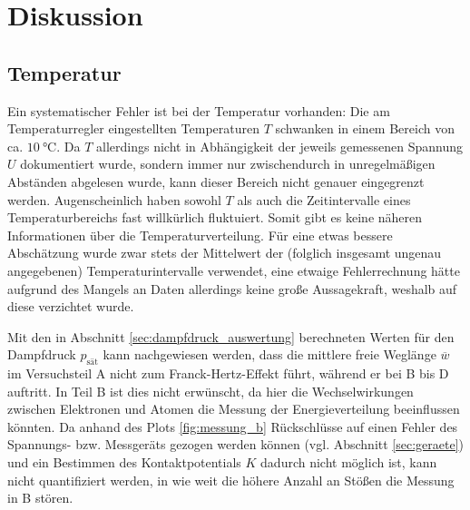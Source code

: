 \section{Diskussion}
\subsection{Temperatur}
\label{sec:temperatur}
Ein systematischer Fehler ist bei der Temperatur vorhanden:
Die am Temperaturregler eingestellten Temperaturen $T$ schwanken in einem Bereich von ca. $\qty[]{10}{\celsius}$.
Da $T$ allerdings nicht in Abhängigkeit der jeweils gemessenen Spannung $U$ dokumentiert wurde, 
sondern immer nur zwischendurch in unregelmäßigen Abständen abgelesen wurde, kann dieser Bereich nicht genauer eingegrenzt werden.
Augenscheinlich haben sowohl $T$ als auch die Zeitintervalle eines Temperaturbereichs fast willkürlich fluktuiert.
Somit gibt es keine näheren Informationen über die Temperaturverteilung.
Für eine etwas bessere Abschätzung wurde zwar stets der Mittelwert der (folglich insgesamt ungenau angegebenen) Temperaturintervalle verwendet,
eine etwaige Fehlerrechnung hätte aufgrund des Mangels an Daten allerdings keine große Aussagekraft, weshalb auf diese verzichtet wurde.

\noindent
Mit den in Abschnitt \ref{sec:dampfdruck_auswertung} berechneten Werten für den Dampfdruck $p_\text{sät}$ 
kann nachgewiesen werden, dass die mittlere freie Weglänge $\overline{w}$ im Versuchsteil A nicht zum Franck-Hertz-Effekt führt, 
während er bei B bis D auftritt.
In Teil B ist dies nicht erwünscht, da hier die Wechselwirkungen zwischen Elektronen und Atomen die Messung der Energieverteilung beeinflussen könnten.
Da anhand des Plots \ref{fig:messung_b} Rückschlüsse auf einen Fehler des Spannungs- bzw. Messgeräts gezogen werden können (vgl. Abschnitt \ref{sec:geraete})
und ein Bestimmen des Kontaktpotentials $K$ dadurch nicht möglich ist, kann nicht quantifiziert werden, in wie weit die höhere Anzahl an Stößen die Messung in B stören. 



